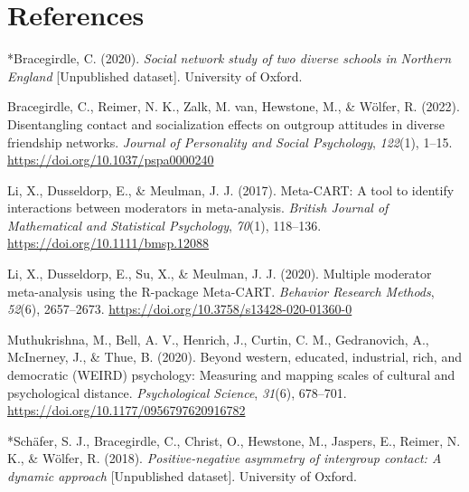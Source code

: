 \documentclass[12pt, letterpaper]{article}
\newenvironment{CSLReferences}[2]{}{}
\begin{document}
\newpage

\hypertarget{references}{%
\section{References}\label{references}}

\begingroup

\noindent \setlength{\parindent}{-0.5in} \setlength{\leftskip}{0.5in}

\hypertarget{refs}{}
\begin{CSLReferences}{1}{0}
\leavevmode\hypertarget{ref-2398}{}%
*Bracegirdle, C. (2020). \emph{Social network study of two diverse
schools in {Northern England}} {[}Unpublished dataset{]}. University of
Oxford.

\leavevmode\hypertarget{ref-bracegirdle_disentangling_2022}{}%
Bracegirdle, C., Reimer, N. K., Zalk, M. van, Hewstone, M., \& Wölfer,
R. (2022). Disentangling contact and socialization effects on outgroup
attitudes in diverse friendship networks. \emph{Journal of Personality
and Social Psychology}, \emph{122}(1), 1--15.
\url{https://doi.org/10.1037/pspa0000240}

\leavevmode\hypertarget{ref-li_meta-cart_2017}{}%
Li, X., Dusseldorp, E., \& Meulman, J. J. (2017). Meta-{CART}: {A} tool
to identify interactions between moderators in meta-analysis.
\emph{British Journal of Mathematical and Statistical Psychology},
\emph{70}(1), 118--136. \url{https://doi.org/10.1111/bmsp.12088}

\leavevmode\hypertarget{ref-li_multiple_2020}{}%
Li, X., Dusseldorp, E., Su, X., \& Meulman, J. J. (2020). Multiple
moderator meta-analysis using the {R}-package {Meta}-{CART}.
\emph{Behavior Research Methods}, \emph{52}(6), 2657--2673.
\url{https://doi.org/10.3758/s13428-020-01360-0}

\leavevmode\hypertarget{ref-muthukrishna_beyond_2020}{}%
Muthukrishna, M., Bell, A. V., Henrich, J., Curtin, C. M., Gedranovich,
A., McInerney, J., \& Thue, B. (2020). Beyond western, educated,
industrial, rich, and democratic ({WEIRD}) psychology: Measuring and
mapping scales of cultural and psychological distance.
\emph{Psychological Science}, \emph{31}(6), 678--701.
\url{https://doi.org/10.1177/0956797620916782}

\leavevmode\hypertarget{ref-2382}{}%
*Schäfer, S. J., Bracegirdle, C., Christ, O., Hewstone, M., Jaspers, E.,
Reimer, N. K., \& Wölfer, R. (2018). \emph{Positive-negative asymmetry
of intergroup contact: A dynamic approach} {[}Unpublished dataset{]}.
University of Oxford.


\end{CSLReferences}
\end{document}
